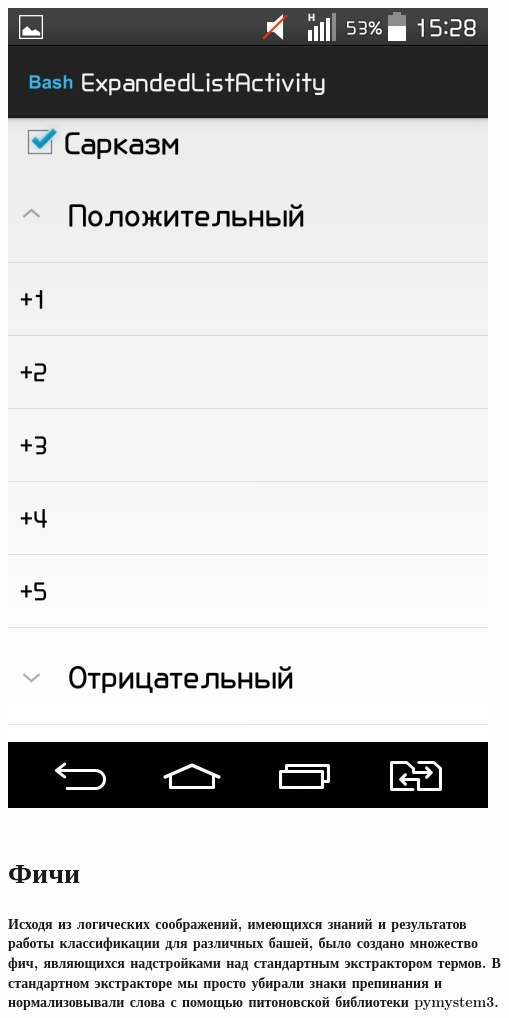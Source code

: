 \documentclass[t]{beamer}
\begin{document}
\begin{frame}
{		\includegraphics[scale = 0.17]{images/Bash3.jpg}}
	\end{frame}


	\section{Фичи}
    \begin{frame}
    	\frametitle{\insertsection}
        \textbf{Исходя из логических соображений, имеющихся знаний и результатов работы классификации для различных башей, было создано множество фич, являющихся надстройками над стандартным экстрактором термов. В стандартном экстракторе мы просто убирали знаки препинания и нормализовывали слова с помощью питоновской библиотеки pymystem3.}
    \end{frame}
\end{document}
